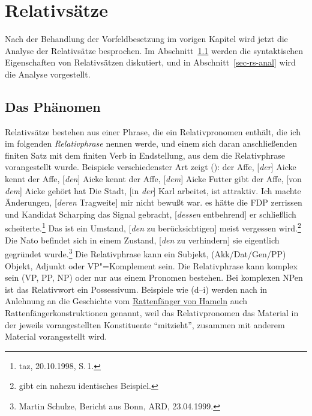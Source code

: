 
\chapter{Relativsätze}
\label{Kapitel-rs}

{%
Nach der Behandlung der Vorfeldbesetzung im vorigen Kapitel wird jetzt
die Analyse der Relativsätze besprochen. Im Abschnitt~\ref{sec-rs-phenomena} werden die syntaktischen
Eigenschaften von Relativsätzen diskutiert, und in Abschnitt~\ref{sec-rs-anal}
wird die Analyse vorgestellt.

\section{Das Phänomen}
\label{sec-rs-phenomena}

Relativsätze bestehen aus einer Phrase, die ein Relativpronomen enthält, die ich im folgenden
\emph{Relativphrase} nennen werde, und einem sich daran anschließenden finiten Satz mit dem finiten Verb in 
Endstellung, aus dem die Relativphrase vorangestellt wurde. Beispiele verschiedenster Art zeigt ():
\eal
\label{bsp-relativsaetze}
\ex der Affe, [\emph{der}] Aicke kennt \label{r1}
\ex der Affe, [\emph{den}] Aicke kennt \label{r1b}
\ex der Affe, [\emph{dem}] Aicke Futter gibt \label{r1c}
\ex der Affe, [von \emph{dem}] Aicke gehört hat \label{r2}
\ex Die Stadt, [in \emph{der}] Karl arbeitet, ist attraktiv. \label{r3}
\ex Ich machte Änderungen, [\emph{deren} Tragweite] mir nicht bewußt war.\label{r4}
\ex es hätte die FDP zerrissen und Kandidat Scharping das Signal gebracht, [\emph{dessen} entbehrend] er schließlich scheiterte.\footnote{
  taz, 20.10.1998, S.\,1.}
\ex Das ist ein Umstand, [\emph{den} zu berücksichtigen] meist vergessen wird.\label{r5}\footnote{
  \citet[]{Bech55a} gibt ein nahezu identisches Beispiel.%
}
\ex Die Nato befindet sich in einem Zustand, [\emph{den} zu verhindern] sie eigentlich gegründet wurde.\footnote{
  Martin Schulze, Bericht aus Bonn, ARD, 23.04.1999.}
\zl
Die Relativphrase kann ein Subjekt, (Akk/Dat/Gen/PP) Objekt, Adjunkt oder VP"=Komplement sein.
\label{page-rattenfaenger}%
Die Relativphrase kann komplex sein (VP, PP, NP) oder nur aus einem Pronomen bestehen.
Bei komplexen NPen ist das Relativwort ein Possessivum. 
Beispiele wie (d--i) werden nach \citet*[]{Ross67} in Anlehnung an die Geschichte vom 
\href{http://www.hameln.de/tourismus/rattenfaenger/}{Rat\-ten\-fän\-ger von Hameln} 
auch Rattenfängerkonstruktionen genannt,
weil das Relativpronomen das Material in der jeweils vorangestellten Konstituente "`mitzieht"', \dash
zusammen mit anderem Material vorangestellt wird.

}
